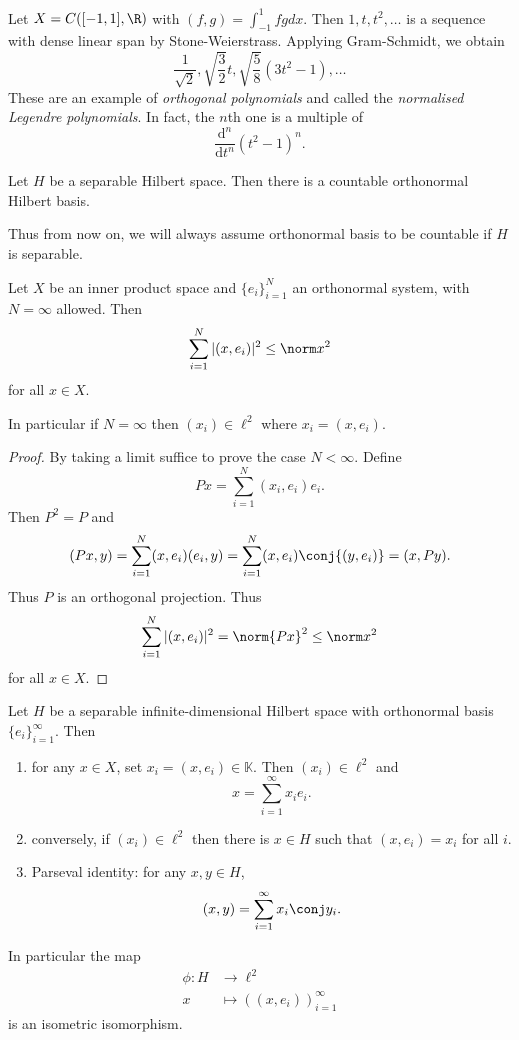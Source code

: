 \documentclass[a4paper]{article}
\newcommand{\K}{{\mathbb{K}}} %
\begin{document}
\begin{eg}
  Let \(X = C([-1, 1], \R)\) with \((f, g) = \int_{-1}^1 fg dx\). Then \(1, t, t^2, \dots\) is a sequence with dense linear span by Stone-Weierstrass. Applying Gram-Schmidt, we obtain
  \[
    \frac{1}{\sqrt{2}}, \sqrt{\frac{3}{2}}t, \sqrt{\frac{5}{8}} (3t^2 - 1), \dots
  \]
  These are an example of \emph{orthogonal polynomials} and called the \emph{normalised Legendre polynomials}. In fact, the \(n\)th one is a multiple of
  \[
    \frac{\mathrm d^n}{\mathrm dt^n}(t^2 - 1)^n.
  \]
\end{eg}

\begin{corollary}
  Let \(H\) be a separable Hilbert space. Then there is a countable orthonormal Hilbert basis.
\end{corollary}

Thus from now on, we will always assume orthonormal basis to be countable if \(H\) is separable.

\begin{proposition}
  Let \(X\) be an inner product space and \(\{e_i\}_{i = 1}^N\) an orthonormal system, with \(N = \infty\) allowed. Then
  \[
    \sum_{i = 1}^N |(x, e_i)|^2 \leq \norm x^2
  \]
  for all \(x \in X\).

  In particular if \(N = \infty\) then \((x_i) \in \ell^2\) where \(x_i = (x, e_i)\).
\end{proposition}

\begin{proof}
  By taking a limit suffice to prove the case \(N < \infty\). Define
  \[
    Px = \sum_{i = 1}^N (x_i, e_i)e_i.
  \]
  Then \(P^2 = P\) and
  \[
    (Px, y) = \sum_{i = 1}^N (x, e_i) (e_i, y) = \sum_{i = 1}^N (x, e_i) \conj{(y, e_i)} = (x, Py).
  \]
  Thus \(P\) is an orthogonal projection. Thus
  \[
    \sum_{i = 1}^N |(x, e_i)|^2 = \norm{Px}^2 \leq \norm x^2
  \]
  for all \(x \in X\).
\end{proof}

\begin{proposition}
  Let \(H\) be a separable infinite-dimensional Hilbert space with orthonormal basis \(\{e_i\}_{i = 1}^\infty\). Then
  \begin{enumerate}
  \item for any \(x \in X\), set \(x_i = (x, e_i) \in \K\). Then \((x_i) \in \ell^2\) and
    \[
      x = \sum_{i = 1}^\infty x_ie_i.
    \]
  \item conversely, if \((x_i) \in \ell^2\) then there is \(x \in H\) such that \((x, e_i) = x_i\) for all \(i\).
  \item Parseval identity: for any \(x, y \in H\),
    \[
      (x, y) = \sum_{i = 1}^\infty x_i \conj y_i.
    \]
  \end{enumerate}

  In particular the map
  \begin{align*}
    \phi: H &\to \ell^2 \\
    x &\mapsto ((x, e_i))_{i = 1}^\infty
  \end{align*}
  is an isometric isomorphism.
\end{proposition}
\end{document}
